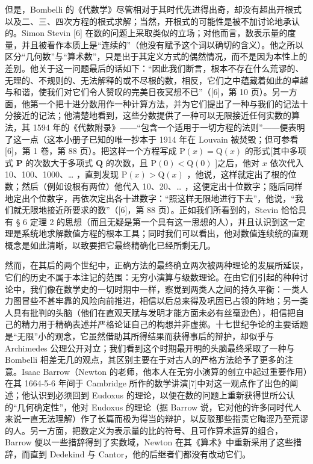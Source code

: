但是，Bombelli 的《代数学》尽管相对于其时代先进得出奇，却没有超出开根式以及二、三、四次方程的根式求解；当然，开根式的可能性是被不加讨论地承认的。Simon Stevin {[}6{]} 在数的问题上采取类似的立场；对他而言，数表示量的度量，并且被看作本质上是“连续的”（他没有赋予这个词以确切的含义）。他之所以区分“几何数”与“算术数”，只是出于其定义方式的偶然情况，而不是因为本性上的差别。他关于这一问题最后的话如下：“因此我们断言，根本不存在什么荒谬的、无理的、不规则的、无法解释的或不尽根的数，相反，它们之中蕴藏着如此的卓越与和谐，使我们对它们令人赞叹的完美日夜冥想不已”（{[}6{]}，第 10 页）。另一方面，他第一个把十进分数用作一种计算方法，并为它们提出了一种与我们的记法十分接近的记法；他清楚地看到，这些分数提供了一种可以无限接近任何实数的算法，其 1594 年的《代数附录》——“包含一个适用于一切方程的法则”——便表明了这一点（这本小册子已知的唯一抄本于 1914 年在 Louvain 被焚毁；但可参看{[}6{]}，第 1 卷，第 88 页）。把这样一个方程写成 \(\mathrm{P}(x) = \mathrm{Q}(x)\) 的形式{[}其中多项式 \(\mathbf{P}\) 的次数大于多项式 \(\mathbf{Q}\) 的次数，且 \(\mathrm{P(0)} < \mathrm{Q(0)}\) {]}之后，他对 \(x\) 依次代入 10、100、1000、\ldots{} ，直到发现 \(\mathrm{P}(x) > \mathrm{Q}(x)\) ，他说，这样就定出了根的位数；然后（例如设根有两位）他代入 10、20、\ldots{} ，这便定出十位数字；随后同样地定出个位数字，再依次定出各十进数字：“照这样无限地进行下去”，他说，“我们就无限地接近所要求的数”（{[}6{]}，第 88 页）。正如我们所看到的，Stevin 恰恰具有 § 6 定理 2 的思想（而且无疑是第一个具有这一思想的人），并且认识到这一定理是系统地求解数值方程的根本工具；同时我们可以看出，他对数值连续统的直观概念是如此清晰，以致要把它最终精确化已经所剩无几。

然而，在其后的两个世纪中，正确方法的最终确立两次被两种理论的发展所延误，它们的历史不属于本注记的范围：无穷小演算与级数理论。在由它们引起的种种讨论中，我们像在数学史的一切时期中一样，察觉到两类人之间的持久平衡：一类人力图冒些不甚牢靠的风险向前推进，相信以后总来得及巩固已占领的阵地；另一类人具有批判的头脑（他们在直观天赋与发明才能方面未必有丝毫逊色），相信把自己的精力用于精确表述并严格论证自己的构想并非虚掷。十七世纪争论的主要话题是“无限”小的观念，它虽然借助其所得结果而获得事后的辩护，却似乎与 Archimedes 公理公开对立；我们看到这个时期最开明的头脑最终采取了一种与 Bombelli 相差无几的观点，其区别主要在于对古人的严格方法给予了更多的注意。Isaac Barrow（Newton 的老师，他本人在无穷小演算的创立中起过重要作用）在其 1664-5-6 年间于 Cambridge 所作的数学讲演{[}7{]}中对这一观点作了出色的阐述；他认识到必须回到 Eudoxus 的理论，以便在数的问题上重新获得世所公认的“几何确定性”，他对 Eudoxus 的理论（据 Barrow 说，它对他的许多同时代人来说一直无法理解）作了长篇而极为得当的辩护，以反驳那些指责它晦涩乃至荒谬的人。另一方面，把数定义为表示量的比的符号、且可作算术运算的组合，Barrow 便以一些措辞得到了实数域，Newton 在其《算术》中重新采用了这些措辞，而直到 Dedekind 与 Cantor，他的后继者们都没有改动它们。

